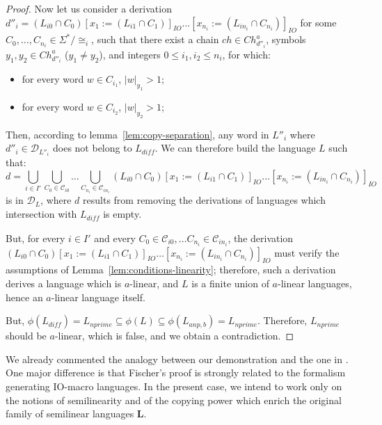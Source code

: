 \begin{proof}
Now let us consider a derivation $d''_i=(L_{i0} \cap C_0)[x_1 := (L_{i1} \cap C_1)]_{IO} \dots [x_{n_i} := (L_{in_i} \cap C_{n_i})]_{IO}$ for some $C_0, \dots, C_{n_i} \in \Sigma^\ast/{\cong_i}$, such that there exist a chain $ch \in {Ch}_{d''_i}^a$, symbols $y_1, y_2 \in {Ch}_{d''_i}^a$ ($y_1 \neq y_2$), and integers $0 \leq i_1, i_2 \leq n_i$, for which:
\begin{itemize}
  \item for every word $w \in C_{i_1}$, $|w|_{y_1} > 1$;
  \item for every word $w \in C_{i_2}$, $|w|_{y_2} > 1$;
\end{itemize}

Then, according to lemma~\ref{lem:copy-separation}, any word in $L''_i$ where $d''_i \in \mathcal{D}_{L''_i}$ does not belong to $L_{\textit{diff}}$. We can therefore build the language $L$ such that:
$$d = \bigcup_{i \in I'}\bigcup_{C_0 \in \mathcal{C}_{i0}} \dots \bigcup_{C_{n_i} \in \mathcal{C}_{in_i}} (L_{i0} \cap C_0)[x_1 := (L_{i1} \cap C_1)]_{IO} \dots [x_{n_i} := (L_{in_i} \cap C_{n_i})]_{IO}$$
is in $\mathcal{D}_L$, where $d$ results from removing the derivations of languages which intersection with $L_{\textit{diff}}$ is empty.

But, for every $i \in I'$ and every $C_0 \in \mathcal{C}_{i0}, \dots C_{n_i} \in \mathcal{C}_{in_i}$, the derivation $(L_{i0} \cap C_0)[x_1 := (L_{i1} \cap C_1)]_{IO} \dots [x_{n_i} := (L_{in_i} \cap C_{n_i})]_{IO}$ must verify the assumptions of Lemma~\ref{lem:conditions-linearity}; therefore, such a derivation derives a language which is $a$-linear, and $L$ is a finite union of $a$-linear languages, hence an $a$-linear language itself.

But, $\phi(L_{\textit{diff}})=L_{nprime} \subseteq \phi(L) \subseteq \phi(L_{anp, b}) = L_{nprime}$. Therefore, $L_{nprime}$ should be $a$-linear, which is false, and we obtain a contradiction.





















\end{proof}

We already commented the analogy between our demonstration and the one in \cite{fischerphd}. One major difference is that Fischer's proof is strongly related to the formalism generating IO-macro languages. In the present case, we intend to work only on the notions of semilinearity and of the copying power which enrich the original family of semilinear languages \textbf{L}.

%
